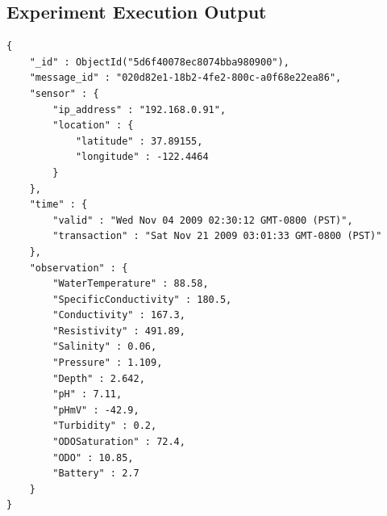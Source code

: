











\subsection{Experiment Execution Output}

\lstset{label=file:mongodb-ysi-data-format,caption=JSON representation of the
data produced by a YSI sensor on mongoDB}
\begin{lstlisting}
{
    "_id" : ObjectId("5d6f40078ec8074bba980900"),
    "message_id" : "020d82e1-18b2-4fe2-800c-a0f68e22ea86",
    "sensor" : {
        "ip_address" : "192.168.0.91",
        "location" : {
            "latitude" : 37.89155,
            "longitude" : -122.4464
        }
    },
    "time" : {
        "valid" : "Wed Nov 04 2009 02:30:12 GMT-0800 (PST)",
        "transaction" : "Sat Nov 21 2009 03:01:33 GMT-0800 (PST)"
    },
    "observation" : {
        "WaterTemperature" : 88.58,
        "SpecificConductivity" : 180.5,
        "Conductivity" : 167.3,
        "Resistivity" : 491.89,
        "Salinity" : 0.06,
        "Pressure" : 1.109,
        "Depth" : 2.642,
        "pH" : 7.11,
        "pHmV" : -42.9,
        "Turbidity" : 0.2,
        "ODOSaturation" : 72.4,
        "ODO" : 10.85,
        "Battery" : 2.7
    }
}
\end{lstlisting}

